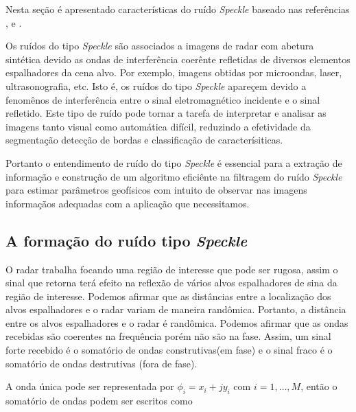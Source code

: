 Nesta seção é apresentado características do ruído {\it Speckle} baseado nas referências \cite{lee}, \cite{lp} e \cite{fmcs}.

Os ruídos do tipo {\it Speckle} são associados a imagens de radar com abetura sintética  devido as ondas de interferência coerênte refletidas de diversos elementos espalhadores da cena alvo. Por exemplo, imagens obtidas por microondas, laser, ultrasonografia, etc. Isto é, os ruídos do tipo {\it Speckle} apareçem devido a fenomênos de interferência entre o sinal eletromagnético  incidente e o sinal refletido. Este tipo de ruído pode tornar a tarefa de interpretar e analisar as imagens tanto visual como automática difícil, reduzindo a efetividade da segmentação detecção de bordas e classificação de caracterísiticas. 

Portanto o entendimento de ruído do tipo {\it Speckle} é essencial para a extração de informação e construção de um algoritmo eficiênte na filtragem do ruído {\it Speckle} para estimar parâmetros geofísicos com intuito de observar nas imagens informaçãos adequadas com a aplicação que necessitamos.

\subsection{A formação do ruído tipo {\it Speckle}}

O radar trabalha focando uma região de interesse que pode ser rugosa, assim o sinal que retorna terá efeito na reflexão de vários alvos espalhadores de sina da região de interesse. Podemos afirmar que as distâncias entre a localização dos alvos espalhadores e o radar variam de maneira randômica. Portanto, a distância entre os alvos espalhadores e o radar é randômica. Podemos afirmar que as ondas recebidas são coerentes na frequência porém não são na fase. Assim, um sinal forte recebido é o somatório de ondas construtivas(em fase) e o sinal fraco é o somatório de ondas destrutivas (fora de fase).

A onda única pode ser representada por $\phi_i=x_i+jy_i$ com $i=1,\dots,M$, então o somatório de ondas podem ser escritos como 

